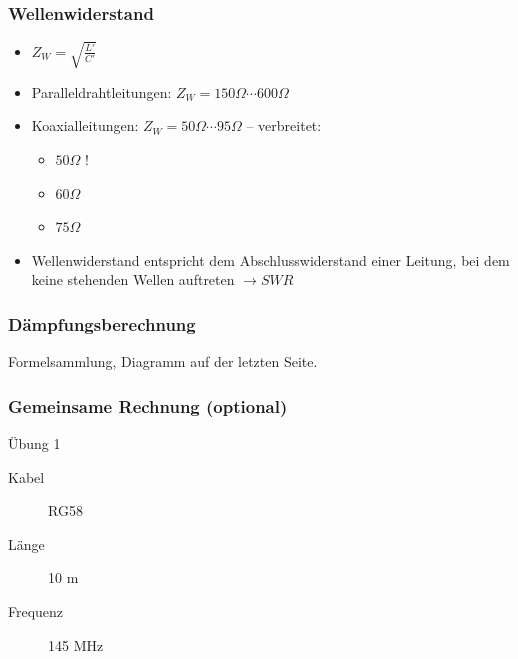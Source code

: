 \begin{frame}
\frametitle{Wellenwiderstand}
\begin{itemize}
	\item \Huge{ $Z_W = \sqrt{\frac{L'}{C'}}$}
	 \normalsize \item Paralleldrahtleitungen: $Z_W = 150 \Omega \cdots 600 \Omega$
	\item Koaxialleitungen: $Z_W =  50 \Omega \cdots 95 \Omega$ -- verbreitet:
    \begin{itemize}
        \item $50 \Omega$ !
        \item $60 \Omega$
        \item $75 \Omega$
    \end{itemize}
	\item Wellenwiderstand entspricht dem Abschlusswiderstand einer Leitung, bei
          dem keine stehenden Wellen auftreten $\rightarrow SWR$
\end{itemize}
\end{frame}

\begin{frame}
\frametitle{Dämpfungsberechnung}
\begin{Large}
Formelsammlung, Diagramm auf der letzten Seite.
\end{Large}
\end{frame}



\begin{frame}
\frametitle{Gemeinsame Rechnung (optional)}
\begin{exampleblock}{Übung 1}
  \begin{description}
 	\item[Kabel] RG58
 	\item[Länge] 10 m
 	\item[Frequenz] 145 MHz
  \end{description}
\end{exampleblock}
\end{frame}

